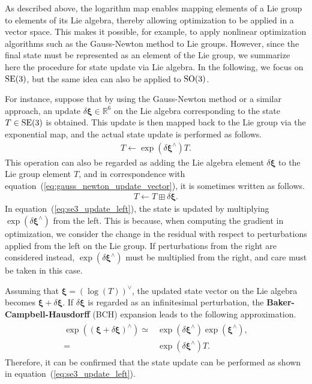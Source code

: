 As described above, the logarithm map enables mapping elements of a Lie group to elements of its Lie algebra, thereby allowing optimization to be applied in a vector space.
This makes it possible, for example, to apply nonlinear optimization algorithms such as the Gauss-Newton method to Lie groups.
However, since the final state must be represented as an element of the Lie group, we summarize here the procedure for state update via Lie algebra.
In the following, we focus on ${\rm SE}(3)$, but the same idea can also be applied to ${\rm SO}(3)$.

For instance, suppose that by using the Gauss-Newton method or a similar approach, an update $\delta \boldsymbol{\xi} \in \mathbb{R}^{6}$ on the Lie algebra corresponding to the state $T \in {\rm SE}(3)$ is obtained.
This update is then mapped back to the Lie group via the exponential map, and the actual state update is performed as follows.
%
\begin{align}
  T \leftarrow \exp \left( \delta \boldsymbol \xi^{\wedge} \right) T.
  \label{eq:se3_update_left}
\end{align}
%
This operation can also be regarded as adding the Lie algebra element $\delta \boldsymbol{\xi}$ to the Lie group element $T$, and in correspondence with equation~(\ref{eq:gauss_newton_update_vector}), it is sometimes written as follows.
%
\begin{align}
  T \leftarrow T \boxplus \delta \boldsymbol \xi.
  \label{eq:se3_update_left_boxplus}
\end{align}
%
In equation~(\ref{eq:se3_update_left}), the state is updated by multiplying $\exp \left( \delta \boldsymbol{\xi}^{\wedge} \right)$ from the left.
This is because, when computing the gradient in optimization, we consider the change in the residual with respect to perturbations applied from the left on the Lie group.
If perturbations from the right are considered instead, $\exp \left( \delta \boldsymbol{\xi}^{\wedge} \right)$ must be multiplied from the right, and care must be taken in this case.

Assuming that $\boldsymbol{\xi} = \left( \log(T) \right)^{\vee}$, the updated state vector on the Lie algebra becomes $\boldsymbol{\xi} + \delta \boldsymbol{\xi}$.
If $\delta \boldsymbol{\xi}$ is regarded as an infinitesimal perturbation, the {\bf Baker-Campbell-Hausdorff} (BCH) expansion leads to the following approximation.
%
\begin{align}
  \begin{split}
    \exp\left( (\boldsymbol \xi + \delta \boldsymbol \xi)^{\wedge} \right)
    \simeq & 
    \exp(\delta \boldsymbol \xi^{\wedge}) \exp(\boldsymbol \xi^{\wedge}), \\
    = &
    \exp(\delta \boldsymbol \xi^{\wedge}) T.
  \end{split}
\end{align}
%
Therefore, it can be confirmed that the state update can be performed as shown in equation~(\ref{eq:se3_update_left}).












